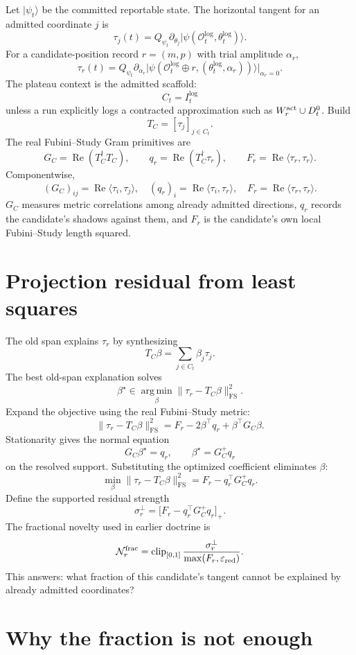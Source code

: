 \documentclass[10pt,twocolumn]{article}
\newcommand{\Ree}{\operatorname{Re}}
\newcommand{\clip}{\operatorname{clip}}
\newcommand{\argmin}{\operatorname*{arg\,min}}
\newcommand{\eps}{\varepsilon}
\newcommand{\logi}{\mathrm{log}}
\newcommand{\FS}{\mathrm{FS}}
\begin{document}
Let $|\psi_t\rangle$ be the committed reportable state. The horizontal tangent
for an admitted coordinate $j$ is
\[
\tau_j(t)=Q_{\psi_t}\partial_{\theta_j}
|\psi(\mathcal O_t^{\logi},\theta_t^{\logi})\rangle .
\]
For a candidate-position record $r=(m,p)$ with trial amplitude $\alpha_r$,
\[
\tau_r(t)=Q_{\psi_t}\partial_{\alpha_r}
|\psi(\mathcal O_t^{\logi}\oplus r,
(\theta_t^{\logi},\alpha_r))\rangle\big|_{\alpha_r=0}.
\]
The plateau context is the admitted scaffold:
\[
C_t=I_t^{\logi}
\]
unless a run explicitly logs a contracted approximation such as
$W_r^{\rm act}\cup D_t^0$. Build
\[
T_C=[\tau_j]_{j\in C_t}.
\]
The real Fubini--Study Gram primitives are
\[
G_C=\Ree(T_C^\dagger T_C),\qquad
q_r=\Ree(T_C^\dagger\tau_r),\qquad
F_r=\Ree\langle\tau_r,\tau_r\rangle .
\]
Componentwise,
\[
(G_C)_{ij}=\Ree\langle\tau_i,\tau_j\rangle,
\quad
(q_r)_i=\Ree\langle\tau_i,\tau_r\rangle,
\quad
F_r=\Ree\langle\tau_r,\tau_r\rangle .
\]
$G_C$ measures metric correlations among already admitted directions, $q_r$
records the candidate's shadows against them, and $F_r$ is the candidate's own
local Fubini--Study length squared.

\section{Projection residual from least squares}

The old span explains $\tau_r$ by synthesizing
\[
T_C\beta=\sum_{j\in C_t}\beta_j\tau_j.
\]
The best old-span explanation solves
\[
\beta^\star\in\argmin_\beta
\|\tau_r-T_C\beta\|_{\FS}^2.
\]
Expand the objective using the real Fubini--Study metric:
\[
\|\tau_r-T_C\beta\|_{\FS}^2
=F_r-2\beta^\top q_r+\beta^\top G_C\beta.
\]
Stationarity gives the normal equation
\[
G_C\beta^\star=q_r,
\qquad
\beta^\star=G_C^+q_r
\]
on the resolved support. Substituting the optimized coefficient eliminates
$\beta$:
\[
\min_\beta\|\tau_r-T_C\beta\|_{\FS}^2
=F_r-q_r^\top G_C^+q_r.
\]
Define the supported residual strength
\[
\sigma_r^\perp=\bigl[F_r-q_r^\top G_C^+q_r\bigr]_+.
\]
The fractional novelty used in earlier doctrine is
\[
\mathcal N_r^{\rm frac}=\clip_{[0,1]}
\frac{\sigma_r^\perp}{\max(F_r,\eps_{\rm red})}.
\]
This answers: what fraction of this candidate's tangent cannot be explained by
already admitted coordinates?

\section{Why the fraction is not enough}
\end{document}
